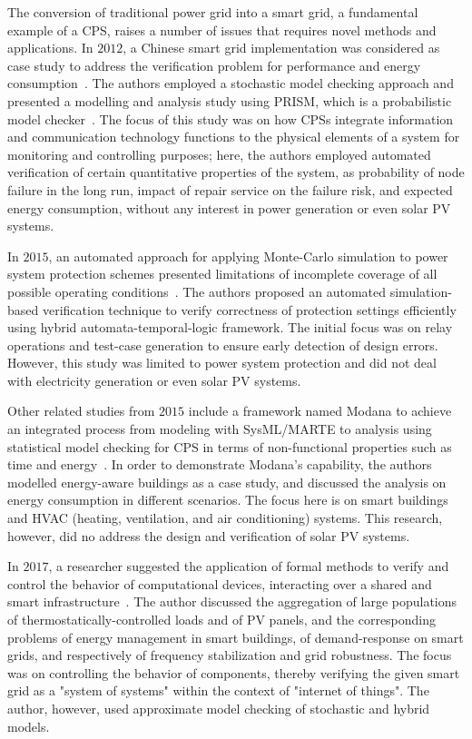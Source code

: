 \documentclass[review]{elsarticle}
\begin{document}
The conversion of traditional power grid into a smart grid, a fundamental example of a CPS, 
raises a number of issues that requires novel methods and applications. In $2012$, a Chinese smart grid implementation was considered as case study to address the verification problem for performance and energy consumption~\cite{Yukseletall2012}. The authors employed a stochastic model checking approach and presented a modelling and analysis study using PRISM, which is a probabilistic model checker~\cite{KwiatkowskaNP11}. The focus of this study was on how CPSs integrate information and communication technology functions to the physical elements of a system for monitoring and controlling purposes; here, the authors employed automated verification of certain quantitative properties of the system, as probability of	 node failure in the long run, impact of repair service on the failure risk, and expected energy consumption, without any interest in power generation or even solar PV systems.

In $2015$, an automated approach for applying Monte-Carlo simulation to power system protection schemes presented limitations of incomplete coverage of all possible operating conditions~\cite{Sengupta2015}. The authors proposed an automated simulation-based verification technique to verify correctness of protection settings efficiently using hybrid automata-temporal-logic framework. The initial focus was on relay operations and test-case generation to ensure early detection of design errors. However, this study was limited to power system protection and did not deal with electricity generation or even solar PV systems.

Other related studies from $2015$ include a framework named Modana to achieve an integrated process from modeling with SysML/MARTE to analysis using statistical model checking for CPS in terms of non-functional properties such as time and energy~\cite{Cheng2015}. In order to demonstrate Modana's capability, the authors modelled energy-aware buildings as a case study, and discussed the analysis on energy consumption in different scenarios. The focus here is on smart buildings and HVAC (heating, ventilation, and air conditioning) systems. This research, however, did no address the design and verification of solar PV systems. 
 
In $2017$, a researcher suggested the application of formal methods to verify and control the behavior of computational devices, interacting over a shared and smart infrastructure~\cite{Abate2017}. The author discussed the aggregation of large populations of thermostatically-controlled loads and of PV panels, and the corresponding problems of energy management in smart buildings, of demand-response on smart grids, and respectively of frequency stabilization and grid robustness. The focus was on controlling the behavior of components, thereby verifying the given smart grid as a "system of systems" within the context of "internet of things". The author, however, used approximate model checking of stochastic and hybrid models.
\end{document}
